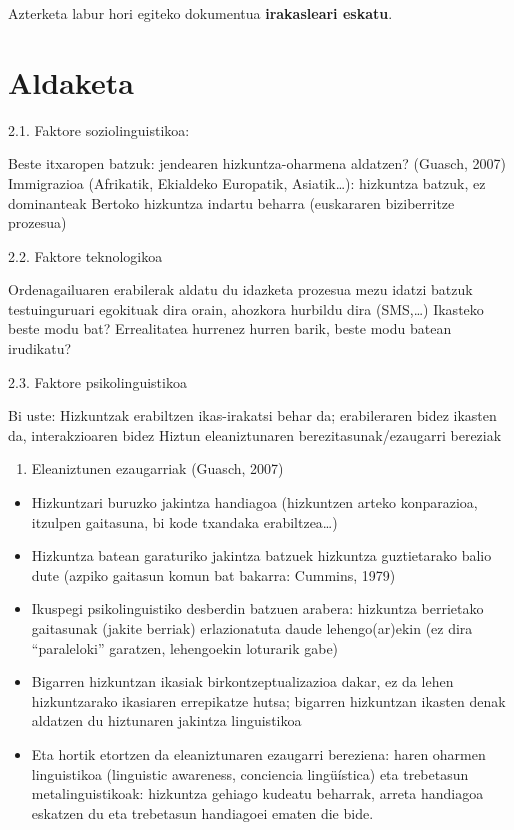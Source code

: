 \documentclass[
]{book}
\providecommand{\tightlist}{%
  \setlength{\itemsep}{0pt}\setlength{\parskip}{0pt}}
\begin{document}
Azterketa labur hori egiteko dokumentua \textbf{irakasleari eskatu}.

\hypertarget{aldaketa}{%
\section{Aldaketa}\label{aldaketa}}

2.1. Faktore soziolinguistikoa:

Beste itxaropen batzuk: jendearen hizkuntza-oharmena aldatzen? (Guasch, 2007)
Immigrazioa (Afrikatik, Ekialdeko Europatik, Asiatik\ldots): hizkuntza batzuk, ez dominanteak
Bertoko hizkuntza indartu beharra (euskararen biziberritze prozesua)

2.2. Faktore teknologikoa

Ordenagailuaren erabilerak aldatu du idazketa prozesua
mezu idatzi batzuk testuinguruari egokituak dira orain, ahozkora hurbildu dira (SMS,\ldots)
Ikasteko beste modu bat? Errealitatea hurrenez hurren barik, beste modu batean irudikatu?

2.3. Faktore psikolinguistikoa

Bi uste:
Hizkuntzak erabiltzen ikas-irakatsi behar da; erabileraren bidez ikasten da, interakzioaren bidez
Hiztun eleaniztunaren berezitasunak/ezaugarri bereziak

\begin{enumerate}
\def\labelenumi{\arabic{enumi}.}
\setcounter{enumi}{1}
\tightlist
\item
  Eleaniztunen ezaugarriak (Guasch, 2007)
\end{enumerate}

\begin{itemize}
\tightlist
\item
  Hizkuntzari buruzko jakintza handiagoa (hizkuntzen arteko konparazioa, itzulpen gaitasuna, bi kode txandaka erabiltzea\ldots)
\item
  Hizkuntza batean garaturiko jakintza batzuek hizkuntza guztietarako balio dute (azpiko gaitasun komun bat bakarra: Cummins, 1979)
\item
  Ikuspegi psikolinguistiko desberdin batzuen arabera: hizkuntza berrietako gaitasunak (jakite berriak) erlazionatuta daude lehengo(ar)ekin (ez dira ``paraleloki'' garatzen, lehengoekin loturarik gabe)
\item
  Bigarren hizkuntzan ikasiak birkontzeptualizazioa dakar, ez da lehen hizkuntzarako ikasiaren errepikatze hutsa; bigarren hizkuntzan ikasten denak aldatzen du hiztunaren jakintza linguistikoa
\item
  Eta hortik etortzen da eleaniztunaren ezaugarri bereziena: haren oharmen linguistikoa (linguistic awareness, conciencia lingüística) eta trebetasun metalinguistikoak: hizkuntza gehiago kudeatu beharrak, arreta handiagoa eskatzen du eta trebetasun handiagoei ematen die bide.
\end{itemize}
\end{document}
